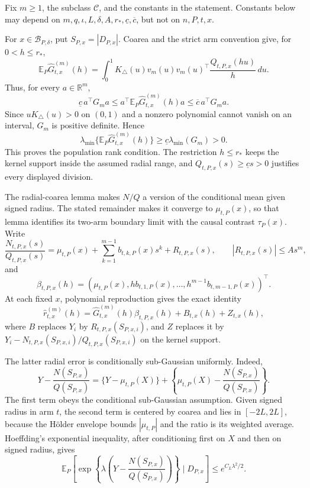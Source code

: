 Fix \(m\geq1\), the subclass \(\mathcal C\), and the constants in the statement.  Constants below may depend on \(m,q,\iota,L,\delta,A,r_*,\underline c,\overline c\), but not on \(n,P,t,x\).

For \(x\in\mathcal B_{P,\delta}\), put \(S_{P,x}=|D_{P,x}|\).  Coarea and the strict arm convention give, for \(0<h\leq r_*\),
\[
 \mathbb E_P\widehat G^{(m)}_{t,x}(h)
 =\int_0^1K_\triangle(u)v_m(u)v_m(u)^\top
 \frac{Q_{t,P,x}(hu)}h\,du.
\]
Thus, for every \(a\in\mathbb R^m\),
\[
 \underline c\,a^\top G_ma
 \leq a^\top\mathbb E_P\widehat G^{(m)}_{t,x}(h)a
 \leq\overline c\,a^\top G_ma.
\]
Since \(uK_\triangle(u)>0\) on \((0,1)\) and a nonzero polynomial cannot vanish on an interval, \(G_m\) is positive definite.  Hence
\[
 \lambda_{\min}\{\mathbb E_P\widehat G^{(m)}_{t,x}(h)\}
 \geq\underline c\lambda_{\min}(G_m)>0.
\]
This proves the population rank condition.  The restriction \(h\leq r_*\) keeps the kernel support inside the assumed radial range, and \(Q_{t,P,x}(s)\geq\underline cs>0\) justifies every displayed division.

The radial-coarea lemma makes \(N/Q\) a version of the conditional mean given signed radius.  The stated remainder makes it converge to \(\mu_{t,P}(x)\), so that lemma identifies its two-arm boundary limit with the causal contrast \(\tau_P(x)\).  Write
\[
 \frac{N_{t,P,x}(s)}{Q_{t,P,x}(s)}
 =\mu_{t,P}(x)+\sum_{k=1}^{m-1}b_{t,k,P}(x)s^k+R_{t,P,x}(s),
 \qquad |R_{t,P,x}(s)|\leq As^m,
\]
and
\[
 \beta_{t,P,x}(h)=
 (\mu_{t,P}(x),hb_{t,1,P}(x),\ldots,h^{m-1}b_{t,m-1,P}(x))^\top.
\]
At each fixed \(x\), polynomial reproduction gives the exact identity
\[
 \widehat r^{(m)}_{t,x}(h)
 =\widehat G^{(m)}_{t,x}(h)\beta_{t,P,x}(h)
 +B_{t,x}(h)+Z_{t,x}(h),
\]
where \(B\) replaces \(Y_i\) by \(R_{t,P,x}(S_{P,x,i})\), and \(Z\) replaces it by
\(Y_i-N_{t,P,x}(S_{P,x,i})/Q_{t,P,x}(S_{P,x,i})\) on the kernel support.

The latter radial error is conditionally sub-Gaussian uniformly.  Indeed,
\[
 Y-\frac{N(S_{P,x})}{Q(S_{P,x})}
 =\{Y-\mu_{t,P}(X)\}
 +\left\{\mu_{t,P}(X)-\frac{N(S_{P,x})}{Q(S_{P,x})}\right\}.
\]
The first term obeys the conditional sub-Gaussian assumption.  Given signed radius in arm \(t\), the second term is centered by coarea and lies in \([-2L,2L]\), because the H\"older envelope bounds \(|\mu_{t,P}|\) and the ratio is its weighted average.  Hoeffding's exponential inequality, after conditioning first on \(X\) and then on signed radius, gives
\[
 \mathbb E_P\!\left[\exp\!\left\{\lambda\left(Y-\frac{N(S_{P,x})}{Q(S_{P,x})}\right)\right\}
 \mid D_{P,x}\right]\leq e^{C_L\lambda^2/2}.
\]

